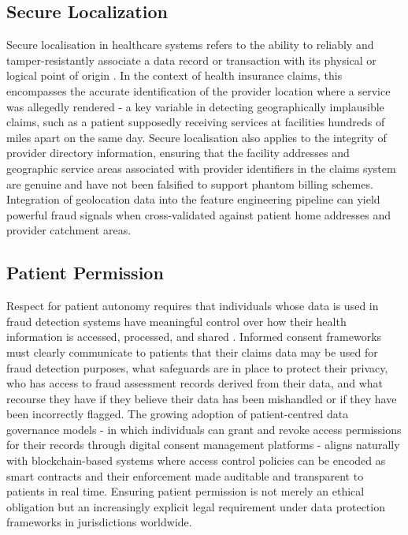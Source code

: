 \subsection{Secure Localization}

Secure localisation in healthcare systems refers to the ability to reliably and tamper-resistantly associate a data record or transaction with its physical or logical point of origin \cite{mohanty2016}. In the context of health insurance claims, this encompasses the accurate identification of the provider location where a service was allegedly rendered - a key variable in detecting geographically implausible claims, such as a patient supposedly receiving services at facilities hundreds of miles apart on the same day. Secure localisation also applies to the integrity of provider directory information, ensuring that the facility addresses and geographic service areas associated with provider identifiers in the claims system are genuine and have not been falsified to support phantom billing schemes. Integration of geolocation data into the feature engineering pipeline can yield powerful fraud signals when cross-validated against patient home addresses and provider catchment areas.

\subsection{Patient Permission}

Respect for patient autonomy requires that individuals whose data is used in fraud detection systems have meaningful control over how their health information is accessed, processed, and shared \cite{gerke2019,pareek2023}. Informed consent frameworks must clearly communicate to patients that their claims data may be used for fraud detection purposes, what safeguards are in place to protect their privacy, who has access to fraud assessment records derived from their data, and what recourse they have if they believe their data has been mishandled or if they have been incorrectly flagged. The growing adoption of patient-centred data governance models - in which individuals can grant and revoke access permissions for their records through digital consent management platforms - aligns naturally with blockchain-based systems where access control policies can be encoded as smart contracts and their enforcement made auditable and transparent to patients in real time. Ensuring patient permission is not merely an ethical obligation but an increasingly explicit legal requirement under data protection frameworks in jurisdictions worldwide.
